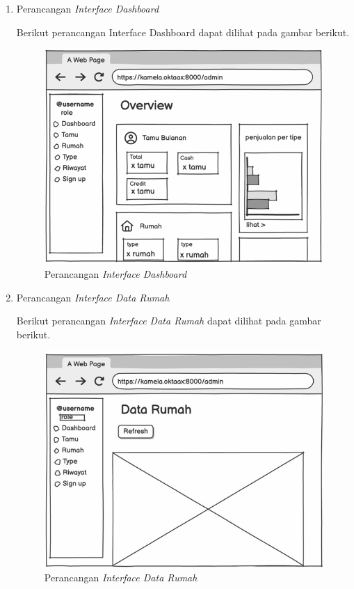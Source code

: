 \begin{enumerate}
        \item Perancangan \textit{Interface Dashboard}
        \par Berikut perancangan Interface Dashboard dapat dilihat pada gambar berikut.
        \begin{figure}
            \centering
            \includegraphics[width=0.75\linewidth]{Wireframe/Dashboard.png}
            \caption{Perancangan \textit{Interface Dashboard}}
        \end{figure}
        
        \item Perancangan \textit{Interface Data Rumah}
        \par Berikut perancangan \textit{Interface Data Rumah} dapat dilihat pada gambar berikut.
        \begin{figure}
            \centering
            \includegraphics[width=0.75\linewidth]{Wireframe/Data Rumah.png}
            \caption{Perancangan \textit{Interface Data Rumah}}
        \end{figure}
        

\end{enumerate}
